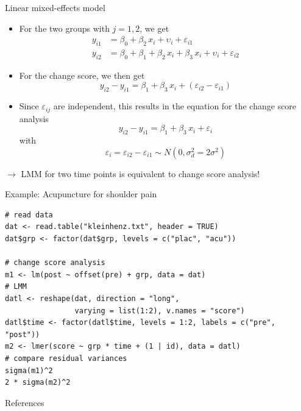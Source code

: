\documentclass[aspectratio=169]{beamer}
\begin{document}
\begin{frame}{Linear mixed-effects model}
\begin{itemize}
  \item For the two groups with $j = 1, 2$, we get
    \begin{align*}
      y_{i1} &= \beta_0 + \beta_2 \, x_i + \upsilon_i + \varepsilon_{i1}\\
      y_{i2} &= \beta_0 + \beta_1 + \beta_2 \, x_i + \beta_3 \, x_i + \upsilon_i + \varepsilon_{i2}
    \end{align*}
  \vspace{-.4cm}
  \item For the change score, we then get
    \[
      y_{i2} - y_{i1} = \beta_1 + \beta_3 \, x_i + (\varepsilon_{i2} - \varepsilon_{i1})
    \]
  \vspace{-.4cm}
  \item Since $\varepsilon_{ij}$ are independent, this results in the
    equation for the change score analysis
    \[
        y_{i2} - y_{i1} = \beta_1 + \beta_3 \, x_i + \varepsilon_{i}
    \]
    with
    \[
        \varepsilon_i = \varepsilon_{i2} - \varepsilon_{i1} \sim N(0, \sigma_d^2 = 2 \sigma^2)
    \]
\end{itemize}
  \vspace{-.3cm}
  $\to$ LMM for two time points is equivalent to change score analysis!
\end{frame}

\begin{frame}[fragile]{Example: Acupuncture for shoulder pain}
\begin{lstlisting}
# read data
dat <- read.table("kleinhenz.txt", header = TRUE)
dat$grp <- factor(dat$grp, levels = c("plac", "acu"))

# change score analysis
m1 <- lm(post ~ offset(pre) + grp, data = dat)
# LMM
datl <- reshape(dat, direction = "long",
                varying = list(1:2), v.names = "score")
datl$time <- factor(datl$time, levels = 1:2, labels = c("pre", "post"))
m2 <- lmer(score ~ grp * time + (1 | id), data = datl)
# compare residual variances
sigma(m1)^2
2 * sigma(m2)^2
\end{lstlisting}
\end{frame}


% 
% 

\begin{frame}{References}
  \printbibliography
  \vfill
\end{frame}
\end{document}
